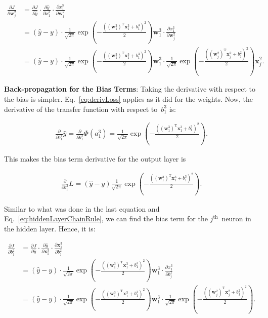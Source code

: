 \documentclass{report}
\newcommand{\w}{\mathbf{w}}
\newcommand{\xvec}{\mathbf{x}}
\newcommand{\yhat}{\hat{y}}
\newcommand{\T}{\text{T}}
\begin{document}
  \begin{align}
    \frac{\partial J}{\partial \w_{j}^{2}} &= \frac{\partial J}{\partial \yhat} \cdot \frac{\partial \yhat}{\partial x_{1}^{3}} \cdot \frac{\partial x_{1}^{3}}{\partial \w_{j}^{2}}\label{eq:hiddenLayerChainRule}\\
      &=\left(\yhat - y\right) \cdot \frac{1}{\sqrt{2\pi}} \exp\left( -\frac{\left(\left(\w_{1}^{3}\right)^\T\xvec_{1}^{3}+b_{1}^{3}\right)^{2}}{2} \right)\w_{1}^{3} \cdot \frac{\partial x_{1}^{3}}{\partial \w_{j}^{2}}\\
      &=\boxed{\left(\yhat - y\right) \cdot \frac{1}{\sqrt{2\pi}} \exp\left( -\frac{\left(\left(\w_{1}^{3}\right)^\T\xvec_{1}^{3}+b_{1}^{3}\right)^{2}}{2} \right)\w_{1}^{3} \cdot \frac{1}{\sqrt{2\pi}} \exp\left( -\frac{\left(\left(\w_{j}^{2}\right)^\T\xvec_{j}^{2}+b_{j}^{2}\right)^{2}}{2} \right)\xvec_{j}^{2}}
      \textrm{.}
  \end{align}

  
  \textbf{Back-propagation for the Bias Terms}: Taking the derivative with respect to the bias is simpler.  Eq.~\ref{eq:derivLoss} applies as it did for the weights.  Now, the derivative of the transfer function with respect to~$b_{1}^{3}$ is:
  
  \begin{align}
    \frac{\partial}{\partial b_{1}^{3}} \yhat = \frac{\partial}{\partial b_{1}^{3}}\Phi(a_{1}^{3})=\frac{1}{\sqrt{2\pi}} \exp\left( -\frac{\left(\left(\w_{1}^{3}\right)^\T\xvec_{1}^{3}+b_{1}^{3}\right)^{2}}{2} \right)\textrm{.}
  \end{align}
    
  This makes the bias term derivative for the output layer is 
    
  \begin{align}
    \frac{\partial}{\partial b_{1}^{3}} L =\boxed{\left(\yhat - y\right)\frac{1}{\sqrt{2\pi}} \exp\left( -\frac{\left(\left(\w_{1}^{3}\right)^\T\xvec_{1}^{3}+b_{1}^{3}\right)^{2}}{2} \right)}\textrm{.}
  \end{align}
  
  Similar to what was done in the last equation and Eq.~\ref{eq:hiddenLayerChainRule}, we can find the bias term for the $j^{\text{th}}$~neuron in the hidden layer.  Hence, it is:
  
    \begin{align}
  \frac{\partial J}{\partial b_{j}^{2}} &= \frac{\partial J}{\partial \yhat} \cdot \frac{\partial \yhat}{\partial \xvec_{1}^{3}} \cdot \frac{\partial \xvec_{1}^{3}}{\partial b_{j}^{2}}\\
    &=\left(\yhat - y\right) \cdot \frac{1}{\sqrt{2\pi}} \exp\left( -\frac{\left(\left(\w_{1}^{3}\right)^\T\xvec_{1}^{3}+b_{1}^{3}\right)^{2}}{2} \right)\w_{1}^{3} \cdot \frac{\partial x_{1}^{3}}{\partial b_{j}^{2}}\\
    &=\boxed{\left(\yhat - y\right) \cdot \frac{1}{\sqrt{2\pi}} \exp\left( -\frac{\left(\left(\w_{1}^{3}\right)^\T\xvec_{1}^{3}+b_{1}^{3}\right)^{2}}{2} \right)\w_{1}^{3} \cdot \frac{1}{\sqrt{2\pi}} \exp\left( -\frac{\left(\left(\w_{j}^{2}\right)^\T\xvec_{j}^{2}+b_{j}^{2}\right)^{2}}{2} \right)}\textrm{.}
  \end{align}
  
\end{document}
